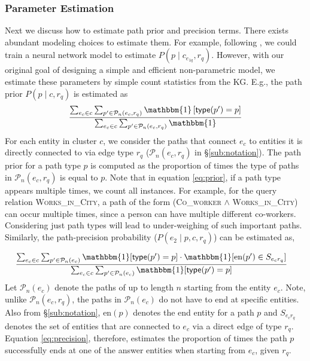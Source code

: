 \documentclass[11pt,a4paper]{article}
\newcommand{\ent}{\ensuremath{e}}
\begin{document}
\subsubsection{Parameter Estimation}
\label{sub:param_estimation}
Next we discuss how to estimate path prior and precision terms. There exists abundant modeling choices to estimate them. For example, following \citet{chen2018variational}, we could train a neural network model to estimate $P(p \mid c_{e_{1q}}, r_q)$. However, with our original goal of designing a simple and efficient non-parametric model, we estimate these parameters by simple count statistics from the KG. E.g., the path prior $P(p \mid c, r_q)$ is estimated as
\begin{align}
     \frac{\sum_{e_c \in c} \sum_{p' \in \mathcal{P}_{n}(e_c, r_q)}\mathbbm{1}\left[\mathsf{type}(p') = p\right]}{\sum_{e_c \in c} \sum_{p' \in \mathcal{P}_{n}(e_c, r_q)}\mathbbm{1}}
    \label{eq:prior}
\end{align}
For each entity in cluster $c$, we consider the paths that connect $e_c$ to entities it is directly connected to via edge type $r_q$ ($ \mathcal{P}_{n}(e_c, r_q)$ in \S\ref{sub:notation}). The path prior for a path type $p$ is computed as the proportion of times the  type of paths in  $\mathcal{P}_{n}(e_c, r_q)$ is equal to $p$. Note that in equation \ref{eq:prior}, if a path type appears multiple times, we count all instances. For example, for the query relation \textsc{Works\_in\_City}, a path of the form (\textsc{Co\_worker} $\wedge$ \textsc{Works\_in\_City}) can occur multiple times, since a person can have multiple different co-workers. Considering just path types will lead to under-weighing of such important paths. Similarly, the path-precision probability ($P(\ent_{2} \mid p, c, r_q)$) can be estimated as,

\begin{align}
& \frac{\sum_{e_c \in c}\sum_{p' \in \mathcal{P}_{n}(e_c)} \mathbbm{1}[\mathsf{type}(p') = p] \cdot \mathbbm{1}[\mathrm{en}(p') \in S_{\ent_c r_q}]}{\sum_{e_c \in c}\sum_{p' \in \mathcal{P}_{n}(e_c)} \mathbbm{1}[\mathsf{type}(p') = p]}
\label{eq:precision}
\end{align}
Let $\mathcal{P}_{n}(e_c)$ denote the paths of up to length $n$ starting from the entity $e_c$. Note, unlike $\mathcal{P}_{n}(e_c, r_q)$, the paths in $\mathcal{P}_{n}(e_c)$ do not have to end at specific entities. Also from \S\ref{sub:notation}, $\mathrm{en}(p)$ denotes the end entity for a path $p$ and $S_{\ent_c r_q}$ denotes the set of entities that are connected to $e_c$ via a direct edge of type $r_q$. Equation \ref{eq:precision}, therefore, estimates the proportion of times the path $p$ successfully ends at one of the answer entities when starting from $e_c$, given $r_q$. 
\end{document}
